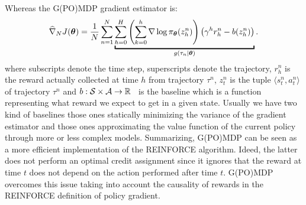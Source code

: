 Whereas the G(PO)MDP gradient estimator is:
\begin{align*}
\gradApp{\vtheta}{N} = \frac{1}{N}\sum_{n=1}^{N}
\underbracket{
	\sum_{h=0}^{H}\left(\sum_{k=0}^{h} \nabla \log \pol (z_h^n) \right)\left(\gamma^h 
	r_h^n
	- b(z^n_h)\right)
}_{g(\tau_n|\vtheta)}.
\end{align*}
where subscripts denote the time step, superscripts denote the trajectory, $r_h^n$ is the reward actually collected at time $h$ from trajectory $\tau^n$, $z_t^n$ is the tuple $\langle s_t^n,a_t^n\rangle$ of trajectory $\tau^n$ and $b : \mathcal{S}\times\mathcal{A} \to \mathbb R$~\citep[\eg][]{Thomas2017actionbaseline} is the baseline which is a function representing what reward we expect to get in a given state. Usually we have two kind of baselines those ones statically minimizing the variance of the gradient estimator and those ones approximating the value function of the current policy through more or less complex models.\newline
Summarizing, G(PO)MDP can be seen as a more efficient implementation of the REINFORCE algorithm. 
Ideed, the latter does not perform an optimal credit assignment since it ignores that the reward at time $t$ does not depend on the action performed after time $t$.
G(PO)MDP overcomes this issue taking into account the causality of rewards in the REINFORCE definition of policy gradient.

